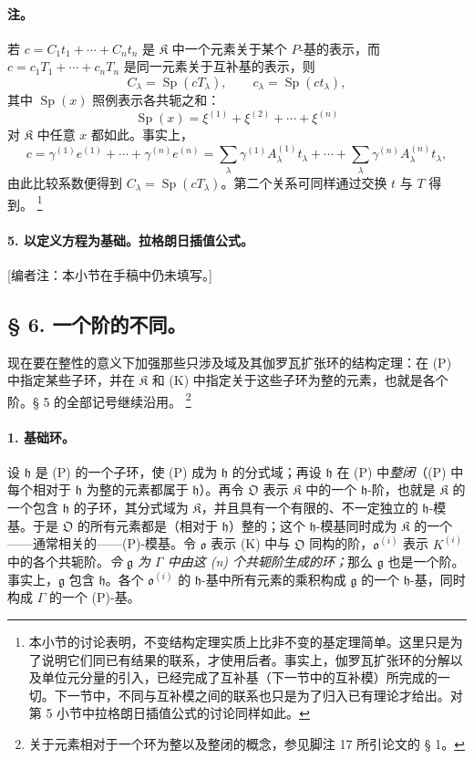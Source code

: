 \documentclass[11pt]{article}
\providecommand{\srcfn}[2]{%
  \begingroup
  \renewcommand{\thefootnote}{#1}%
  \footnote{#2}%
  \addtocounter{footnote}{-1}%
  \endgroup}
\begin{document}
\paragraph{注。}
若 $c=C_1t_1+\cdots+C_nt_n$ 是 $\mathfrak K$ 中一个元素关于某个 $P$-基的表示，而 $c=c_1T_1+\cdots+c_nT_n$ 是同一元素关于互补基的表示，则
\[
C_\lambda=\operatorname{Sp}(cT_\lambda),
\qquad c_\lambda=\operatorname{Sp}(ct_\lambda),
\]
其中 $\operatorname{Sp}(x)$ 照例表示各共轭之和：
\[
\operatorname{Sp}(x)=\xi^{(1)}+\xi^{(2)}+\cdots+\xi^{(n)}
\]
对 $\mathfrak K$ 中任意 $x$ 都如此。事实上，
\[
c=\gamma^{(1)}e^{(1)}+\cdots+\gamma^{(n)}e^{(n)}
=\sum_\lambda\gamma^{(1)}A_\lambda^{(1)}t_\lambda+
\cdots+\sum_\lambda\gamma^{(n)}A_\lambda^{(n)}t_\lambda,
\]
由此比较系数便得到 $C_\lambda=\operatorname{Sp}(cT_\lambda)$。第二个关系可同样通过交换 $t$ 与 $T$ 得到。\srcfn{19)}{本小节的讨论表明，不变结构定理实质上比非不变的基定理简单。这里只是为了说明它们同已有结果的联系，才使用后者。事实上，伽罗瓦扩张环的分解以及单位元分量的引入，已经完成了互补基（下一节中的互补模）所完成的一切。下一节中，不同与互补模之间的联系也只是为了归入已有理论才给出。对第 5 小节中拉格朗日插值公式的讨论同样如此。}

\paragraph{5. 以定义方程为基础。拉格朗日插值公式。}
[编者注：本小节在手稿中仍未填写。]
\subsection*{\S{} 6. 一个阶的不同。}

现在要在整性的意义下加强那些只涉及域及其伽罗瓦扩张环的结构定理：在 (P) 中指定某些子环，并在 \(\mathfrak K\) 和 (K) 中指定关于这些子环为整的元素，也就是各个阶。§ 5 的全部记号继续沿用。\srcfn{20)}{关于元素相对于一个环为整以及整闭的概念，参见脚注 17 所引论文的 § 1。}

\paragraph{1. 基础环。}
设 \(\mathfrak h\) 是 (P) 的一个子环，使 (P) 成为 \(\mathfrak h\) 的分式域；再设 \(\mathfrak h\) 在 (P) 中\emph{整闭}（(P) 中每个相对于 \(\mathfrak h\) 为整的元素都属于 \(\mathfrak h\)）。再令 \(\mathfrak O\) 表示 \(\mathfrak K\) 中的一个 \(\mathfrak h\)-阶，也就是 \(\mathfrak K\) 的一个包含 \(\mathfrak h\) 的子环，其分式域为 \(\mathfrak K\)，并且具有一个有限的、不一定独立的 \(\mathfrak h\)-模基。于是 \(\mathfrak O\) 的所有元素都是（相对于 \(\mathfrak h\)）整的；这个 \(\mathfrak h\)-模基同时成为 \(\mathfrak K\) 的一个——通常相关的——(P)-模基。令 \(\mathfrak o\) 表示 (K) 中与 \(\mathfrak O\) 同构的阶，\(\mathfrak o^{(i)}\) 表示 \(K^{(i)}\) 中的各个共轭阶。\emph{令 \(\mathfrak g\) 为 \(\Gamma\) 中由这 (n) 个共轭阶生成的环；}那么 \(\mathfrak g\) 也是一个阶。事实上，\(\mathfrak g\) 包含 \(\mathfrak h\)。各个 \(\mathfrak o^{(i)}\) 的 \(\mathfrak h\)-基中所有元素的乘积构成 \(\mathfrak g\) 的一个 \(\mathfrak h\)-基，同时构成 \(\Gamma\) 的一个 (P)-基。
\end{document}
